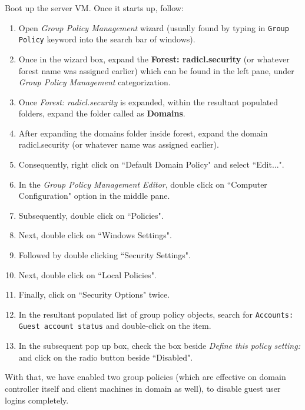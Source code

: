 \documentclass[12pt]{extarticle}
\begin{document}
\begin{enumerate}
	Boot up the server VM. Once it starts up, follow:
   
	\begin{enumerate}
		\item Open \textit{Group Policy Management} wizard (usually found by typing in \texttt{Group Policy} keyword into the search bar of windows).
		\item Once in the wizard box, expand the \textbf{Forest: radicl.security} (or whatever forest name was assigned earlier) which can be found in the left pane, under \textit{Group Policy Management} categorization.
		\item Once \textit{Forest: radicl.security} is expanded, within the resultant populated folders, expand the folder called as \textbf{Domains}.
		\item After expanding the domains folder inside forest, expand the domain radicl.security (or whatever name was assigned earlier).
		\item Consequently, right click on ``Default Domain Policy" and select ``Edit...".
		\item In the \textit{Group Policy Management Editor}, double click on ``Computer Configuration" option in the middle pane.
		\item Subsequently, double click on ``Policies".
		\item Next, double click on ``Windows Settings".
		\item Followed by double clicking ``Security Settings".
		\item Next, double click on ``Local Policies".
		\item Finally, click on ``Security Options" twice.
		\item In the resultant populated list of group policy objects, search for \texttt{Accounts: Guest account status} and double-click on the item.
		\item In the subsequent pop up box, check the box beside \textit{Define this policy setting:} and click on the radio button beside ``Disabled". 
	\end{enumerate}
	
	With that, we have enabled two group policies (which are effective on domain controller itself and client machines in domain as well), to disable guest user logins completely.
	
\end{enumerate}
 

\end{document}
